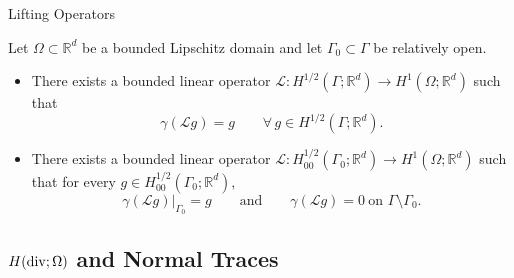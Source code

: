 \documentclass[10pt,aspectratio=169]{beamer}
\def\R{{\mathbb R}}
\def\cL{{\mathcal L}}
\newcommand{\diver}{\operatornamewithlimits{div}}
\begin{document}
\begin{frame}{Lifting Operators}
	\begin{theorem}
		Let $\Omega\subset\R^d$ be a bounded Lipschitz domain and let $\Gamma_0\subset\Gamma$ be relatively open.

		\begin{itemize}
			\item[i)] There exists a bounded linear operator $\cL:H^{1/2}(\Gamma;\R^d)\to H^1(\Omega;\R^d)$ such that
			      \begin{equation*}
				      \gamma(\cL g)=g
				      \qquad\forall\,g\in H^{1/2}(\Gamma;\R^d).
			      \end{equation*}

			\item[ii)] There exists a bounded linear operator $ \cL:H^{1/2}_{00}(\Gamma_0;\R^d)\to H^1(\Omega;\R^d)$
			      such that for every $g\in H^{1/2}_{00}(\Gamma_0;\R^d)$,
			      \begin{equation*}
				      \gamma(\cL g)|_{\Gamma_0}=g
				      \qquad\text{and}\qquad
				      \gamma(\cL g)=0\ \text{on }\Gamma\setminus\Gamma_0.
			      \end{equation*}
		\end{itemize}
	\end{theorem}
\end{frame}

\subsection{\texorpdfstring{$H(\diver;\Omega)$}{Hdiv} and Normal Traces}
\end{document}
